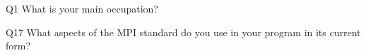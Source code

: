 \begin{description}%
\item{Q1} What is your main occupation?%
\item{Q17} What aspects of the MPI standard do you use in your program in its current form?%
\end{description}%
